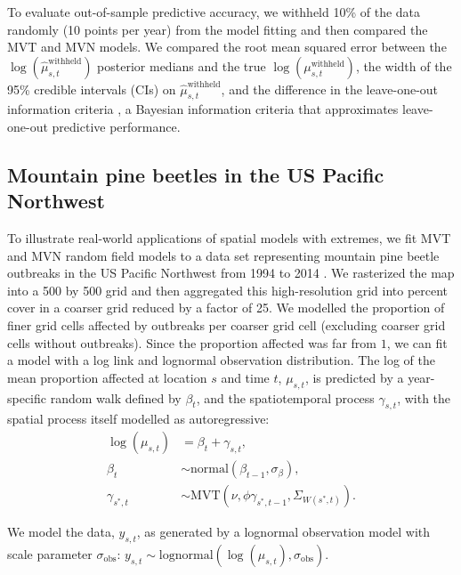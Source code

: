 \documentclass[12pt,english]{article}
\begin{document}
\begin{spacing}{1.9}
To evaluate out-of-sample predictive accuracy, we withheld 10\% of the data
randomly (10 points per year) from the model fitting and then compared the MVT
and MVN models. We compared the root mean squared error between the
$\log(\hat{\mu}^{\mathrm{withheld}}_{s,t})$ posterior medians and the true
$\log\left(\mu^{\mathrm{withheld}}_{s,t}\right)$, the width of the 95\% credible
intervals (CIs) on $\hat{\mu}^{\mathrm{withheld}}_{s,t}$, and the difference in
the leave-one-out information criteria \citep[LOOIC;][]{vehtari2017}, a Bayesian
information criteria that approximates leave-one-out predictive performance.

\subsection{Mountain pine beetles in the US Pacific Northwest}
\label{sec:beetles-methods}

To illustrate real-world applications of spatial models with extremes, we fit
MVT and MVN random field models to a data set representing mountain pine beetle
outbreaks in the US Pacific Northwest from 1994 to 2014
\citep{usdaforestservice2017}. We rasterized the map into a 500 by 500 grid and
then aggregated this high-resolution grid into percent cover in a coarser grid
reduced by a factor of 25.
We modelled the proportion of finer grid cells affected by outbreaks per coarser
grid cell (excluding coarser grid cells without outbreaks). Since the proportion
affected was far from $1$, we can fit a model with a log link and lognormal
observation distribution. The log of the mean proportion affected at location
$s$ and time $t$, $\mu_{s,t}$, is predicted by a year-specific random walk
defined by $\beta_t$, and the spatiotemporal process $\gamma_{s,t}$, with the
spatial process itself modelled as autoregressive:
\begin{align} \log(\mu_{s,t}) &= \beta_t + \gamma_{s,t}, \label{eq:beetle-mu} \\
  \beta_t &\sim \mathrm{normal}\left( \beta_{t-1}, \sigma_{\beta} \right), \\
  \gamma_{s^{*},t} &\sim \mathrm{MVT}\left(\nu, \phi \gamma_{s^{*},t-1}, \Sigma_{W(s^{*},t)}\right).
\end{align}

\noindent We model the data, $y_{s,t}$, as generated by a lognormal
observation model with scale parameter $\sigma_{\mathrm{obs}}$: $y_{s,t} \sim
\mathrm{lognormal} \left(  \log(\mu_{s,t}), \sigma_{\mathrm{obs}} \right)$.


\end{spacing}
\end{document}
